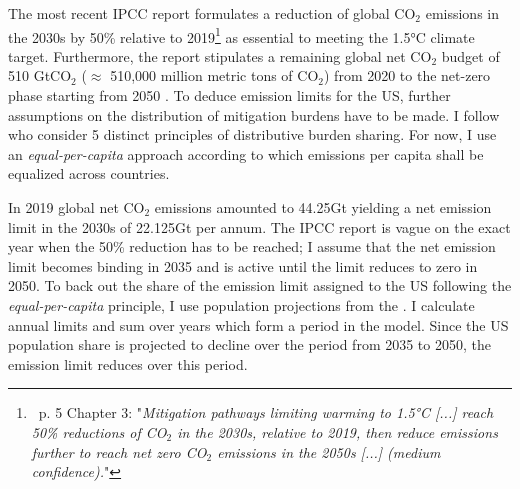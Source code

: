  The most recent IPCC report \citep{IPCC2022} formulates a reduction of global CO$_2$ emissions in the 2030s by 50\% relative to 2019\footnote{\ p. 5 Chapter 3: "\textit{Mitigation pathways limiting warming to 1.5°C [...] reach 50\% reductions of CO$_2$ in the 2030s, relative to 2019, then reduce emissions further to reach net zero CO$_2$ emissions in the 2050s [...] (\textnormal{medium confidence}).}"}  as essential to meeting the 1.5°C climate target.  Furthermore, the report stipulates a remaining global net CO$_2$ budget of 510 GtCO$_2$ ($\approx$ 510,000 million metric tons of CO$_2$) from 2020 to the net-zero phase starting from 2050 \citep[p.5, Chapter3,]{IPCC2022}. 
To deduce emission limits for the US, further assumptions on the distribution of mitigation burdens have to be made. I follow \cite{RobiouDuPont2017EquitableGoals} who consider 5 distinct principles of distributive burden sharing. For now, I use an \textit{equal-per-capita} approach according to which emissions per capita shall be equalized across countries. 

 
% 
 In 2019 global net CO$_2$ emissions amounted to 44.25Gt \citep[compare figure SPM1.a p.11 in ][]{IPCCSPM} yielding a net emission limit in the 2030s of 22.125Gt per annum. The IPCC report is vague on the exact year when the 50\% reduction has to be reached; I assume that the net emission limit becomes binding in 2035 and is active until the limit reduces to zero in 2050. 
 To back out the share of the emission limit assigned to the US following the \textit{equal-per-capita} principle, I use population projections from the \cite{UNPOP}. %
 I calculate annual limits and sum over years which form a period in the model.  Since the US population share is projected to decline over the period from 2035 to 2050, the emission limit reduces over this period. 
 
